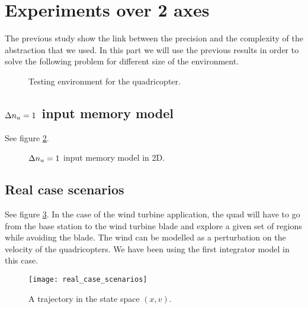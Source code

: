 \section{Experiments over 2 axes}
The previous study show the link between the precision and the complexity of the abstraction that we used.
In this part we will use the previous results in order to solve the following problem for different size of the environment.
\begin{figure}
	\center
	
	\caption{Testing environment for the quadricopter.}
	\label{fig:environment}
\end{figure}


\subsection{$\Delta n_u = 1$ input memory model}
See figure \ref{fig:double_reduce_2D}.

\begin{figure*}
	\center
	
	\caption{$\Delta n_u=1$ input memory model in 2D.}
	\label{fig:double_reduce_2D}
\end{figure*}


\subsection{Real case scenarios}
See figure \ref{fig:real_case}.
In the case of the wind turbine application, the quad will have to go from the base station to the wind turbine blade and explore a given set of regions while avoiding the blade.
The wind can be modelled as a perturbation on the velocity of the quadricopters.
We have been using the first integrator model in this case.

\begin{figure}[!ht]
  \centering
  \texttt{[image: real\_case\_scenarios]}
  \caption{A trajectory in the state space $(x,v)$.}
  \label{fig:real_case}
\end{figure}

